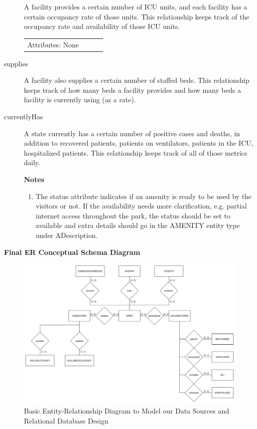 \documentclass[11pt]{article}
\begin{document}
\begin{description}
\noindent
A facility provides a certain number of ICU units, and each facility has a certain occupancy rate of those units. This relationship keeps track of the occupancy rate and availability of those ICU units.

\begin{tabular}{lllc}
     Attributes: None \\
\end{tabular}

\item [supplies]

\noindent
A facility also supplies a certain number of staffed beds. This relationship keeps track of how many beds a facility provides and how many beds a facility is currently using (as a rate).

\item [currentlyHas]

\noindent
A state currently has a certain number of positive cases and deaths, in addition to recovered patients, patients on ventilators, patients in the ICU, hospitalized patients. This relationship keeps track of all of those metrics daily.

\noindent
\textbf{Notes}
\begin{enumerate}
    \item The status attribute indicates if an amenity is ready to be used by the visitors or not. If the availability needs more clarification, e.g. partial internet access throughout the park, the status should be set to available and extra details should go in the AMENITY entity type under ADescription.
\end{enumerate}

\end{description}



\noindent
\textbf{Final ER Conceptual Schema Diagram}

\FloatBarrier
\begin{figure}[h]
    \centering
    \includegraphics[width=\textwidth]{diagrams/ER1.png}
    \caption{Basic Entity-Relationship Diagram to Model our Data Sources and Relational Database Design}
    \label{fig:er1}
\end{figure}
\FloatBarrier
\end{document}
